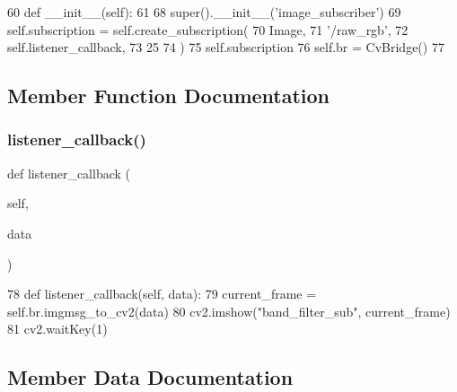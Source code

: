 \begin{DoxyCode}
60     \textcolor{keyword}{def }\_\_init\_\_(self):
61         
68         super().\_\_init\_\_(\textcolor{stringliteral}{'image\_subscriber'})
69         self.subscription = self.create\_subscription(
70                 Image, 
71                 \textcolor{stringliteral}{'/raw\_rgb'}, 
72                 self.listener\_callback, 
73                 25
74                 )
75         self.subscription
76         self.br = CvBridge()
77     
\end{DoxyCode}


\subsection{Member Function Documentation}
\mbox{\label{classtoxic__vision_1_1webcam__sub_1_1ImageSubscriber_a23dd9943cb7cb7be2a6e7022a85a1684}} 
\subsubsection{\texorpdfstring{listener\+\_\+callback()}{listener\_callback()}}
{\footnotesize\ttfamily def listener\+\_\+callback (\begin{DoxyParamCaption}\item[{}]{self,  }\item[{}]{data }\end{DoxyParamCaption})}


\begin{DoxyCode}
78     \textcolor{keyword}{def }listener\_callback(self, data):
79         current\_frame = self.br.imgmsg\_to\_cv2(data)
80         cv2.imshow(\textcolor{stringliteral}{"band\_filter\_sub"}, current\_frame)
81         cv2.waitKey(1)
\end{DoxyCode}


\subsection{Member Data Documentation}
\mbox{\label{classtoxic__vision_1_1webcam__sub_1_1ImageSubscriber_a88f0860257ba6bdc089557444f5cdd16}} 
